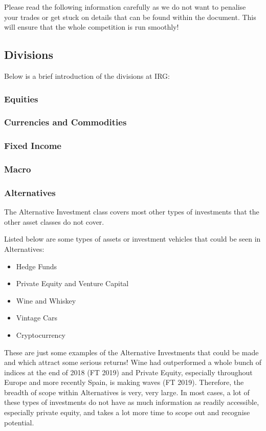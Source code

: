 \documentclass[a4paper]{article}
\begin{document}
{\vspace{10pt}
\noindent Please read the following information carefully as we do not want to penalise your trades or get stuck on details that can be found within the document. This will ensure that the whole competition is run smoothly!

\subsection{Divisions}
Below is a brief introduction of the divisions at IRG:

\subsubsection{Equities}

\subsubsection{Currencies and Commodities}

\subsubsection{Fixed Income}

\subsubsection{Macro}

\subsubsection{Alternatives}
The Alternative Investment class covers most other types of investments that the other asset classes do not cover.

\vspace{10pt}
\noindent Listed below are some types of assets or investment vehicles that could be seen in Alternatives:
\begin{itemize}
	\item Hedge Funds
	\item Private Equity and Venture Capital
	\item Wine and Whiskey
	\item Vintage Cars
	\item Cryptocurrency
\end{itemize}
These are just some examples of the Alternative Investments that could be made and which attract some serious returns! Wine had outperformed a whole bunch of indices at the end of 2018 (FT 2019) and Private Equity, especially throughout Europe and more recently Spain, is making waves (FT 2019). Therefore, the breadth of scope within Alternatives is very, very large. In most cases, a lot of these types of investments do not have as much information as readily accessible, especially private equity, and takes a lot more time to scope out and recognise potential.

}
\end{document}
